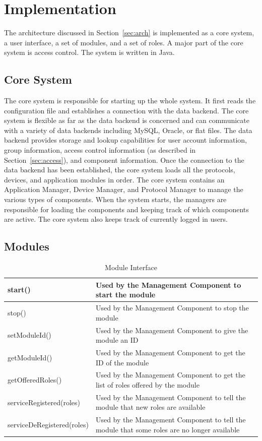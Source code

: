 \section{Implementation}
\label{sec:implementation}
The architecture discussed in Section~\ref{sec:arch} is implemented as a core
system, a user interface, a set of modules, and a set of roles. A major part of
the core system is access control. The system is written in Java.
\subsection{Core System}
\label{sec:core}
The core system is responsible for starting up the whole system. It first reads
the configuration file and establishes a connection with the data backend. The
core system is flexible as far as the data backend is concerned and can
communicate with a variety of data backends including MySQL, Oracle, or flat
files. The data backend provides storage and lookup capabilities for user
account information, group information, access control information (as described
in Section~\ref{sec:access}), and component information. Once the connection to
the data backend has been established, the core system loads all the protocols,
devices, and application modules in order. The core system contains an
Application Manager, Device Manager, and Protocol Manager to manage the various
types of components. When the system starts, the managers are responsible for
loading the components and keeping track of which components are active. The
core system also keeps track of currently logged in users.
\subsection{Modules}
\label{sec:modules}
\begin{table}
\begin{center}
\begin{tabular}{| p{4cm} | p{3cm} |}
\hline
start() & Used by the Management Component to start the module \\ \hline
stop() & Used by the Management Component to stop the module \\ \hline
setModuleId() & Used by the Management Component to give the module an ID \\ \hline
getModuleId() & Used by the Management Component to get the ID of the module \\ \hline
getOfferedRoles() & Used by the Management Component to get the list of roles
offered by the module \\ \hline
serviceRegistered(roles) & Used by the Management Component to tell
the module that new roles are available \\ \hline
serviceDeRegistered(roles) & Used by the Management Component to tell
the module that some roles are no longer available \\ \hline
\end{tabular}
\end{center}
\caption{Module Interface}
\label{tab:module}
\end{table}

